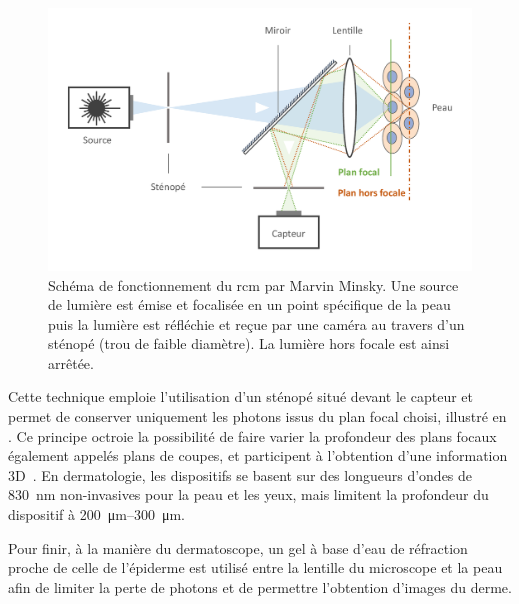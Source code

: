 \addtocounter{footnote}{1}

\begin{figure}[H]
\centering
    \includegraphics[width=0.9\linewidth]{contents/chapter_2/resources/scheme_principle_rcm.pdf}
    \caption{Schéma de fonctionnement du \gls{rcm} par Marvin Minsky. Une source de lumière est émise et focalisée en un point spécifique de la peau puis la lumière est réfléchie et reçue par une caméra au travers d'un sténopé (trou de faible diamètre). La lumière hors focale est ainsi arrêtée.}
    \label{fig:scheme_principle_rcm}
\end{figure}\par

Cette technique emploie l’utilisation d’un sténopé situé devant le capteur et permet de conserver uniquement les photons issus du plan focal choisi, illustré en . Ce principe octroie la possibilité de faire varier la profondeur des plans focaux également appelés plans de coupes, et participent à l’obtention d’une information 3D~\cite{Sheppard2019}. En dermatologie, les dispositifs se basent sur des longueurs d’ondes de \SI{830}{\nano\metre} non-invasives pour la peau et les yeux, mais limitent la profondeur du dispositif à \SIrange{200}{300}{\micro\metre}.\par

Pour finir, à la manière du dermatoscope, un gel à base d’eau de réfraction proche de celle de l’épiderme est utilisé entre la lentille du microscope et la peau afin de limiter la perte de photons et de permettre l’obtention d’images du derme.\par

